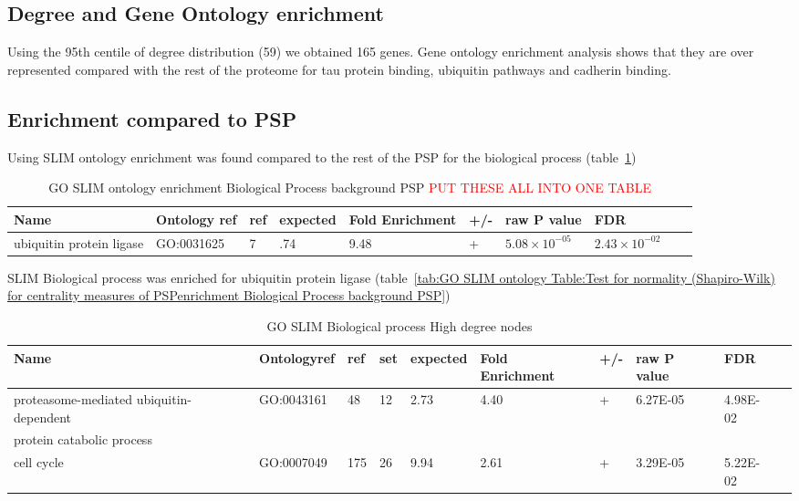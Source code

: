 \subsection{Degree and Gene Ontology enrichment}

Using the 95th centile of degree distribution (59) we obtained 165 genes. Gene ontology enrichment analysis shows that they are over represented compared with the rest of the proteome for tau protein binding, ubiquitin pathways and cadherin binding.

\subsection{Enrichment compared to PSP}

Using SLIM ontology enrichment was found compared to the rest of the PSP for the biological process (table~\ref{tab:GO SLIM ontology enrichment Biological Process background PSP})

\begin{table}
\centering
\begin{adjustbox}{max width=\textwidth}
\begin{tabular}{llllllllll}
Name & Ontology ref &ref &	expected &	Fold Enrichment &	+/-	&raw P value&FDR\\
\hline
ubiquitin protein ligase & GO:0031625&  	7 &  	.74 & 	9.48 &  	+ & 	$5.08\times 10^{-05}$ & 	$2.43 \times 10^{-02}$\\
\end{tabular}
\end{adjustbox}
\caption{GO SLIM ontology enrichment Biological Process background PSP \textcolor{red}{PUT THESE ALL INTO ONE TABLE}}
\label{tab:GO SLIM ontology enrichment Biological Process background PSP}
\end{table}



SLIM Biological process was enriched for ubiquitin protein ligase (table~\ref{tab:GO SLIM ontology Table:Test for normality (Shapiro-Wilk) for centrality measures of PSPenrichment Biological Process background PSP})%






\begin{table}
\centering
\begin{adjustbox}{max width=\textwidth}
\begin{tabular}{l l l l l l l l l l}
Name & Ontologyref &ref & set&	expected &	Fold Enrichment &	+/-	&raw P value&FDR\\
\hline
proteasome-mediated ubiquitin-dependent &GO:0043161 & 48 & 	12  &	2.73 &	4.40 & 	+ & 	6.27E-05 & 	4.98E-02 \\
protein catabolic process\\
cell cycle& GO:0007049&	175 	&26 &	9.94& 	2.61 &	+ & 	3.29E-05& 5.22E-02\\
\end{tabular}
\end{adjustbox}
\caption{GO SLIM Biological process High degree nodes}
\label{tab: high degree slim biological process}
\end{table}

